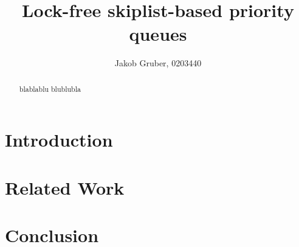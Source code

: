 \documentclass[a4paper,10pt]{article}
\title{Lock-free skiplist-based priority queues}
\author{Jakob Gruber, 0203440}
\begin{document}
\maketitle

\begin{abstract}
blablablu blublubla
\end{abstract}

\section{Introduction}
\section{Related Work}
\section{Conclusion}
\end{document}
